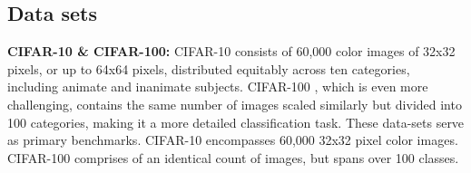 \documentclass{article}
\begin{document}
\subsection{Data sets}

\textbf{CIFAR-10 \& CIFAR-100: }CIFAR-10 \cite{krizhevsky2009learning} consists of 60,000 color images of 32x32 pixels, or up to 64x64 pixels, distributed equitably across ten categories, including animate and inanimate subjects. CIFAR-100 \cite{singla2021improved}, which is even more challenging, contains the same number of images scaled similarly but divided into 100 categories, making it a more detailed classification task. These data-sets serve as primary benchmarks. CIFAR-10 encompasses 60,000 32x32 pixel color images. CIFAR-100 comprises of an identical count of images, but spans over 100 classes.
\end{document}
